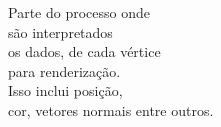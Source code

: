\documentclass[preview]{standalone}
\begin{document}
Parte do processo onde\\são interpretados \\os dados, de cada vértice \\para renderização.\\Isso inclui posição,\\cor, vetores normais entre outros.\\
\end{document}
